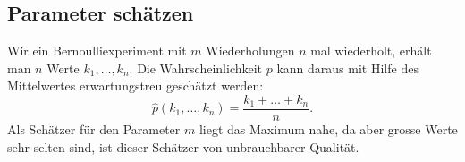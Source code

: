 \subsection{Parameter schätzen}
Wir ein Bernoulliexperiment mit $m$ Wiederholungen $n$ mal wiederholt, erhält
man $n$ Werte $k_1,\dots,k_n$.
Die Wahrscheinlichkeit $p$ kann daraus mit Hilfe des Mittelwertes erwartungstreu
geschätzt werden:
\[
\hat p(k_1,\dots, k_n)=\frac{k_1+\dots+k_n}{n}.
\]
Als Schätzer für den Parameter $m$ liegt das Maximum nahe, da aber
grosse Werte sehr selten sind, ist dieser Schätzer von unbrauchbarer
Qualität.

